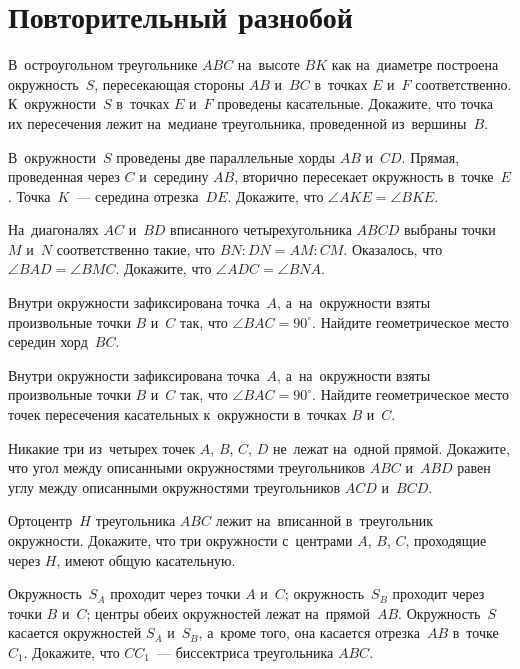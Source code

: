 
\section*{Повторительный разнобой}


\begin{problems}

\item
В~остроугольном треугольнике $ABC$ на~высоте $BK$ как на~диаметре построена
окружность~$S$, пересекающая стороны $AB$ и~$BC$ в~точках $E$ и~$F$
соответственно.
К~окружности~$S$ в~точках $E$ и~$F$ проведены касательные.
Докажите, что точка их пересечения лежит на~медиане треугольника,
проведенной из~вершины~$B$.

\item
В~окружности~$S$ проведены две параллельные хорды $AB$ и~$CD$.
Прямая, проведенная через $C$ и~середину $AB$, вторично пересекает окружность
в~точке~$E$.
Точка~$K$~--- середина отрезка~$DE$.
Докажите, что $\angle AKE = \angle BKE$.

\item
На~диагоналях $AC$ и~$BD$ вписанного четырехугольника $ABCD$ выбраны точки
$M$ и~$N$ соответственно такие, что $BN : DN = AM : CM$.
Оказалось, что $\angle BAD = \angle BMC$.
Докажите, что $\angle ADC = \angle BNA$.

\item
Внутри окружности зафиксирована точка~$A$, а~на~окружности взяты произвольные
точки $B$ и~$C$ так, что $\angle BAC = 90^{\circ}$.
Найдите геометрическое место середин хорд~$BC$.

\item
Внутри окружности зафиксирована точка~$A$, а~на~окружности взяты произвольные
точки $B$ и~$C$ так, что $\angle BAC = 90^{\circ}$.
Найдите геометрическое место точек пересечения касательных к~окружности
в~точках $B$ и~$C$.

\item
Никакие три из~четырех точек $A$, $B$, $C$, $D$ не~лежат на~одной прямой.
Докажите, что угол между описанными окружностями треугольников $ABC$ и~$ABD$
равен углу между описанными окружностями треугольников $ACD$ и~$BCD$.

\item
Ортоцентр~$H$ треугольника $ABC$ лежит на~вписанной в~треугольник окружности.
Докажите, что три окружности с~центрами $A$, $B$, $C$, проходящие через $H$,
имеют общую касательную.

\item
Окружность~$S_A$ проходит через точки $A$ и~$C$;
окружность~$S_B$ проходит через точки $B$ и~$C$;
центры обеих окружностей лежат на~прямой~$AB$.
Окружность~$S$ касается окружностей $S_A$ и~$S_B$, а~кроме того, она касается
отрезка~$AB$ в~точке~$C_1$.
Докажите, что $C C_1$~--- биссектриса треугольника $ABC$.

\end{problems}

